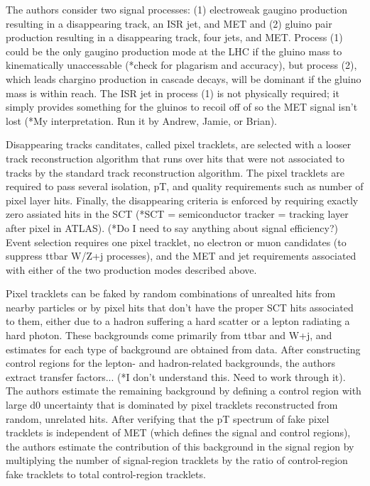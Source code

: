 \documentclass[12pt]{article}
\begin{document}
            The authors consider two signal processes: (1) electroweak gaugino production resulting in a disappearing track, an ISR jet, and MET and (2) gluino pair production resulting in a disappearing track, four jets, and MET. Process (1) could be the only gaugino production mode at the LHC if the gluino mass to kinematically unaccessable (*check for plagarism and accuracy), but process (2), which leads chargino production in cascade decays,  will be dominant if the gluino mass is within reach. The ISR jet in process (1) is not physically required; it simply provides something for the gluinos to recoil off of so the MET signal isn't lost (*My interpretation. Run it by Andrew, Jamie, or Brian).

            Disappearing tracks canditates, called pixel tracklets, are selected with a looser track reconstruction algorithm that runs over hits that were not associated to tracks by the standard track reconstruction algorithm. The pixel tracklets are required to pass several isolation, pT, and quality requirements such as number of pixel layer hits. Finally, the disappearing criteria is enforced by requiring exactly zero assiated hits in the SCT (*SCT = semiconductor tracker = tracking layer after pixel in ATLAS). (*Do I need to say anything about signal efficiency?) Event selection requires one pixel tracklet, no electron or muon candidates (to suppress ttbar W/Z+j processes), and the MET and jet requirements associated with either of the two production modes described above.
            
            Pixel tracklets can be faked by random combinations of unrealted hits from nearby particles or by pixel hits that don't have the proper SCT hits associated to them, either due to a hadron suffering a hard scatter or a lepton radiating a hard photon. These backgrounds come primarily from ttbar and W+j, and estimates for each type of background are obtained from data. After constructing control regions for the lepton- and hadron-related backgrounds, the authors extract transfer factors... (*I don't understand this. Need to work through it). The authors estimate the remaining background by defining a control region with large d0 uncertainty that is dominated by pixel tracklets reconstructed from random, unrelated hits. After verifying that the pT spectrum of fake pixel tracklets is independent of MET (which defines the signal and control regions), the authors estimate the contribution of this background in the signal region by multiplying the number of signal-region tracklets by the ratio of control-region fake tracklets to total control-region tracklets.
\end{document}
